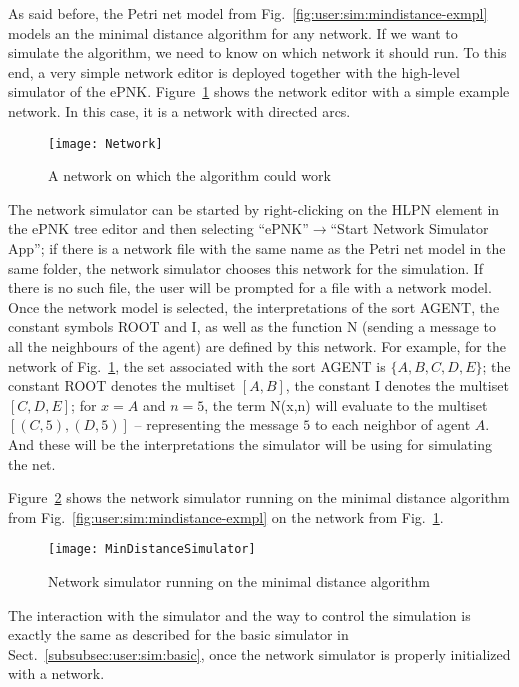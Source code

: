 As said before, the Petri net model from
Fig.~\ref{fig:user:sim:mindistance-exmpl} models an the minimal
distance algorithm for any network. If we want to simulate the
algorithm, we need to know on which network it should run. To this end,
a very simple network editor is deployed together with the high-level
simulator of the ePNK. Figure~\ref{fig:user:sim:network} shows the
network editor with a simple example network. In this case, it
is a network with directed arcs.
%
\begin{figure}[hbt!!]
  \centerline{\texttt{[image: Network]}}
  \caption{A network on which the algorithm could work}
  \label{fig:user:sim:network}
\end{figure}
%
The network simulator can be started by right-clicking on the HLPN element in
the ePNK tree editor and then selecting ``ePNK''$\rightarrow$``Start Network
Simulator App''; if there is a network file with the same name as the Petri
net model in the same folder, the network simulator chooses this network for
the simulation. If there is no such file, the user will be prompted for
a file with a network model. Once the network model is selected, the
interpretations of the sort {\sf AGENT}, the constant symbols {\sf ROOT}
and {\sf I}, as well as the function {\sf N} (sending a message to all
the neighbours of the agent) are defined by this network. For example, for
the network of Fig.~\ref{fig:user:sim:network}, the set associated with
the sort {\sf AGENT} is $\{ A, B, C, D, E \}$; the constant {\sf ROOT}
denotes the multiset $[A, B]$, the constant {\sf I} denotes the multiset
$[ C, D, E]$; for $x = A$ and $n = 5$, the term {\sf N(x,n)} will evaluate to
the multiset $[ (C,5), (D,5) ]$ -- representing the message $5$ to each neighbor
of agent $A$. And these will be the interpretations the simulator will be using
for simulating the net.

Figure~\ref{fig:user:sim:mindistance-sim} shows the network simulator running
on the minimal distance algorithm from
Fig.~\ref{fig:user:sim:mindistance-exmpl} on the network from
Fig.~\ref{fig:user:sim:network}.
%
\begin{figure}[hbt!!]
  \centerline{\texttt{[image: MinDistanceSimulator]}}
  \caption{Network simulator running on the minimal distance algorithm}
  \label{fig:user:sim:mindistance-sim}
\end{figure}
% 
The interaction with the simulator and the way to control the simulation is
exactly the same as described for the basic simulator in
Sect.~\ref{subsubsec:user:sim:basic}, once the network simulator is
properly initialized with a network.

